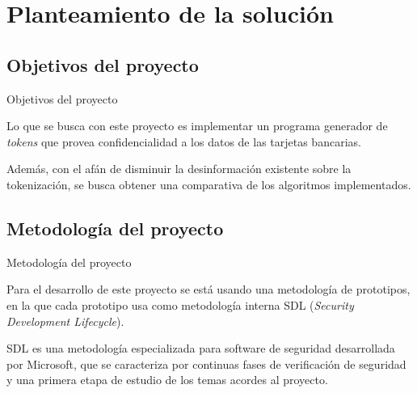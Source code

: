 %
%

\section{Planteamiento de la solución}

\subsection{Objetivos del proyecto} %
\begin{frame}{Objetivos del proyecto}

  Lo que se busca con este proyecto es implementar un programa generador de
  \textit{tokens} que provea confidencialidad a los datos de las tarjetas
  bancarias.

  Además, con el afán de disminuir la desinformación existente sobre la
  tokenización, se busca obtener una comparativa de los algoritmos
  implementados.

\end{frame}

\subsection{Metodología del proyecto} %
\begin{frame}{Metodología del proyecto}

  Para el desarrollo de este proyecto se está usando una metodología de
  prototipos, en la que cada prototipo usa como metodología interna SDL
  (\textit{Security Development Lifecycle}).

  SDL es una metodología especializada para software de seguridad desarrollada
  por Microsoft, que se caracteriza por continuas fases de verificación de
  seguridad y una primera etapa de estudio de los temas acordes al proyecto.


\end{frame}


